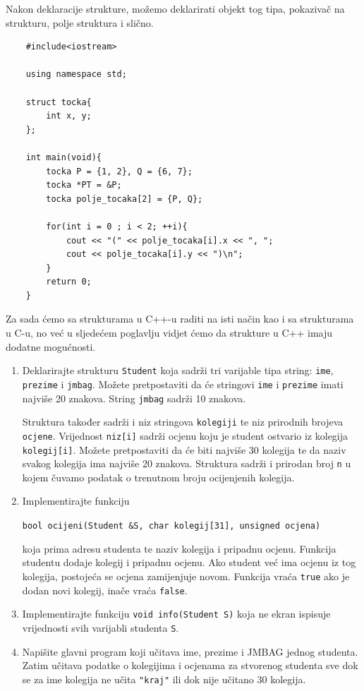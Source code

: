 Nakon deklaracije strukture, možemo deklarirati objekt tog tipa, pokazivač na strukturu, polje struktura i slično.

\begin{verbatim}
    #include<iostream>

    using namespace std;

    struct tocka{
        int x, y;
    };

    int main(void){
        tocka P = {1, 2}, Q = {6, 7};
        tocka *PT = &P;
        tocka polje_tocaka[2] = {P, Q};

        for(int i = 0 ; i < 2; ++i){
            cout << "(" << polje_tocaka[i].x << ", ";
            cout << polje_tocaka[i].y << ")\n";
        }
        return 0;
    }
\end{verbatim}
Za sada ćemo sa strukturama u C++-u raditi na isti način kao i sa strukturama u C-u, no već u sljedećem poglavlju vidjet ćemo da strukture u C++ imaju dodatne mogućnosti.

\begin{zadatak}\label{zad:student-basic}
    \begin{enumerate}
        \item Deklarirajte strukturu \texttt{Student} koja sadrži tri varijable tipa string: \texttt{ime}, \texttt{prezime} i \texttt{jmbag}.
        Možete pretpostaviti da će stringovi \texttt{ime} i \texttt{prezime} imati najviše 20 znakova. String \texttt{jmbag} sadrži 10 znakova.

        Struktura također sadrži i niz stringova \texttt{kolegiji} te niz prirodnih brojeva \texttt{ocjene}. Vrijednost \texttt{niz[i]} sadrži ocjenu koju je student ostvario iz kolegija \texttt{kolegij[i]}.
        Možete pretpostaviti da će biti najviše 30 kolegija te da naziv svakog kolegija ima najviše 20 znakova. Struktura sadrži i prirodan broj \texttt{n} u kojem čuvamo podatak o trenutnom broju ocijenjenih kolegija.
        
        \item Implementirajte funkciju 
        \begin{center}
            \texttt{bool ocijeni(Student &S, char kolegij[31], unsigned ocjena)}
        \end{center}
        koja prima adresu studenta te naziv kolegija i pripadnu ocjenu. Funkcija studentu dodaje kolegij i pripadnu ocjenu. Ako student već ima ocjenu iz tog kolegija, postojeća se ocjena zamijenjuje novom. Funkcija vraća \texttt{true} ako je dodan novi kolegij, inače vraća \texttt{false}.
        
        \item Implementirajte funkciju \texttt{void info(Student S)} koja ne ekran ispisuje vrijednosti svih varijabli studenta \texttt{S}.

        \item Napišite glavni program koji učitava ime, prezime i JMBAG jednog studenta. Zatim učitava podatke o kolegijima i ocjenama za stvorenog studenta sve dok se za ime kolegija ne učita \texttt{"kraj"} ili dok nije učitano 30 kolegija.
    \end{enumerate}
        
\end{zadatak}

